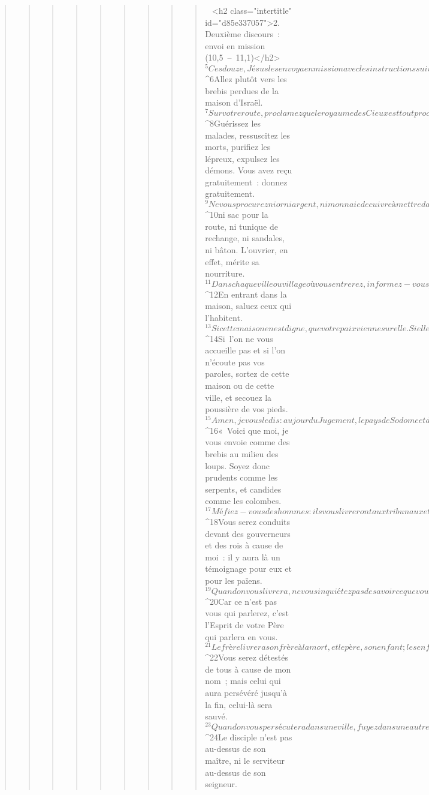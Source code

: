 \begin{verse}
\begin{verse}
\begin{verse}
\begin{verse}
\begin{verse}
\begin{verse}
\begin{verse}
\begin{verse}
\begin{verse}
         
      <h2 class="intertitle" id="d85e337057">2. Deuxième discours : envoi en mission (10,5 – 11,1)</h2>
${}^{5}Ces douze, Jésus les envoya en mission avec les instructions suivantes : « Ne prenez pas le chemin qui mène vers les nations païennes et n’entrez dans aucune ville des Samaritains. 
${}^{6}Allez plutôt vers les brebis perdues de la maison d’Israël. 
${}^{7}Sur votre route, proclamez que le royaume des Cieux est tout proche. 
${}^{8}Guérissez les malades, ressuscitez les morts, purifiez les lépreux, expulsez les démons. Vous avez reçu gratuitement : donnez gratuitement.
${}^{9}Ne vous procurez ni or ni argent, ni monnaie de cuivre à mettre dans vos ceintures, 
${}^{10}ni sac pour la route, ni tunique de rechange, ni sandales, ni bâton. L’ouvrier, en effet, mérite sa nourriture.
${}^{11}Dans chaque ville ou village où vous entrerez, informez-vous pour savoir qui est digne de vous accueillir, et restez là jusqu’à votre départ. 
${}^{12}En entrant dans la maison, saluez ceux qui l’habitent. 
${}^{13}Si cette maison en est digne, que votre paix vienne sur elle. Si elle n’en est pas digne, que votre paix retourne vers vous. 
${}^{14}Si l’on ne vous accueille pas et si l’on n’écoute pas vos paroles, sortez de cette maison ou de cette ville, et secouez la poussière de vos pieds. 
${}^{15}Amen, je vous le dis : au jour du Jugement, le pays de Sodome et de Gomorrhe sera traité moins sévèrement que cette ville.
${}^{16}« Voici que moi, je vous envoie comme des brebis au milieu des loups. Soyez donc prudents comme les serpents, et candides comme les colombes.
${}^{17}Méfiez-vous des hommes : ils vous livreront aux tribunaux et vous flagelleront dans leurs synagogues. 
${}^{18}Vous serez conduits devant des gouverneurs et des rois à cause de moi : il y aura là un témoignage pour eux et pour les païens. 
${}^{19}Quand on vous livrera, ne vous inquiétez pas de savoir ce que vous direz ni comment vous le direz : ce que vous aurez à dire vous sera donné à cette heure-là. 
${}^{20}Car ce n’est pas vous qui parlerez, c’est l’Esprit de votre Père qui parlera en vous. 
${}^{21}Le frère livrera son frère à la mort, et le père, son enfant ; les enfants se dresseront contre leurs parents et les feront mettre à mort. 
${}^{22}Vous serez détestés de tous à cause de mon nom ; mais celui qui aura persévéré jusqu’à la fin, celui-là sera sauvé. 
${}^{23}Quand on vous persécutera dans une ville, fuyez dans une autre. Amen, je vous le dis : vous n’aurez pas fini de passer dans toutes les villes d’Israël quand le Fils de l’homme viendra.
${}^{24}Le disciple n’est pas au-dessus de son maître, ni le serviteur au-dessus de son seigneur. 

\end{verse}
\end{verse}
\end{verse}
\end{verse}
\end{verse}
\end{verse}
\end{verse}
\end{verse}
\end{verse}
